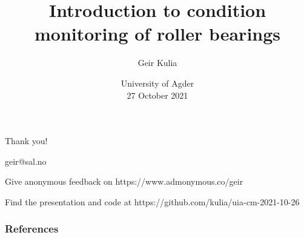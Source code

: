 \documentclass{beamer}
\title[Condition monitoring]{%
    Introduction to condition monitoring of roller bearings
    \vspace{0.5cm}
}
\author{ Geir Kulia}
\date[UiA 27.10.21]{%
    University of Agder\\27 October 2021
}
\begin{document}

{
    \maketitle
}

% 













\begin{frame}
    \frametitle{}
    \centering
    
    Thank you!

    \vspace{0.5cm}
    geir@sal.no
    
    \vspace{0.5cm}
    
    Give anonymous feedback on
    https://www.admonymous.co/geir
    
    \vspace{0.5cm}
    Find the presentation and code at
    https://github.com/kulia/uia-cm-2021-10-26

\end{frame}

\begin{frame}
\frametitle{References}
\small

\end{frame}




\end{document}
